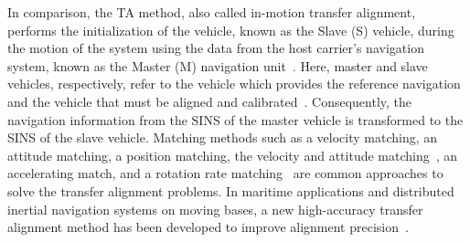 \documentclass[3p]{elsarticle}
\begin{document}
In comparison, the TA method, also called in-motion transfer alignment, performs the initialization of the vehicle, known as the Slave (S) vehicle, during the motion of the system using the data from the host carrier's navigation system, known as the Master (M) navigation unit~\cite{gelb1974applied}. Here, master and slave vehicles, respectively, refer to the vehicle which provides the reference navigation and the vehicle that must be aligned and calibrated~\cite{gelb1974applied}. Consequently, the navigation information from the SINS of the master vehicle is transformed to the SINS of the slave vehicle. Matching methods such as a velocity matching, an attitude matching, a position matching, the velocity and attitude matching~\cite{bekir2007introduction}, an accelerating match, and a rotation rate matching~\cite{yuksel_2005} are common approaches to solve the transfer alignment problems.
In maritime applications and distributed inertial navigation systems on moving bases, a new high-accuracy transfer alignment method has been developed to improve alignment precision~\cite{8833639}.
\end{document}
